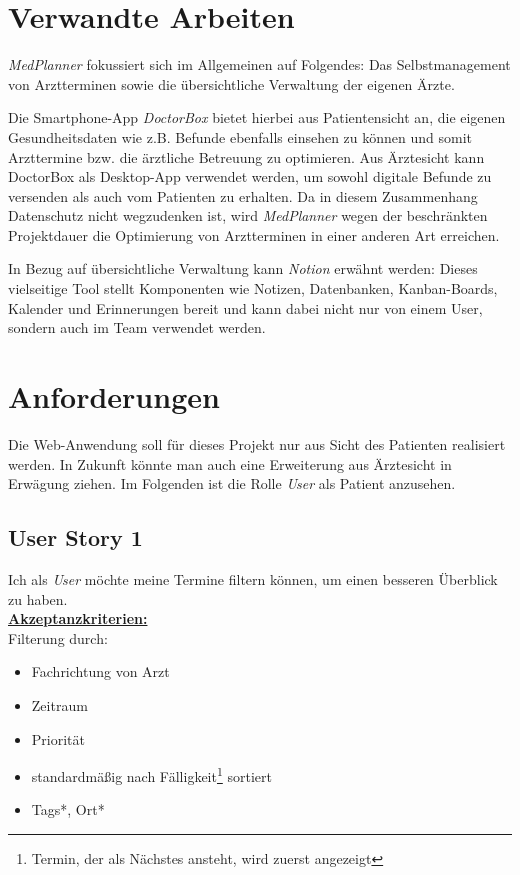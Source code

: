 \documentclass[conference]{IEEEtran}
\begin{document}
\section{Verwandte Arbeiten}
\textit{MedPlanner} fokussiert sich im Allgemeinen auf Folgendes: Das Selbstmanagement von Arztterminen sowie die übersichtliche Verwaltung der eigenen Ärzte.

Die Smartphone-App \textit{DoctorBox}\cite{docBox} bietet hierbei aus Patientensicht an, die eigenen Gesundheitsdaten wie z.B. Befunde ebenfalls einsehen zu können und somit Arzttermine bzw. die ärztliche Betreuung zu optimieren. Aus Ärztesicht kann DoctorBox als Desktop-App verwendet werden, um sowohl digitale Befunde zu versenden als auch vom Patienten zu erhalten. Da in diesem Zusammenhang Datenschutz nicht wegzudenken ist, wird \textit{MedPlanner} wegen der beschränkten Projektdauer die Optimierung von Arztterminen in einer anderen Art erreichen.

In Bezug auf übersichtliche Verwaltung kann \textit{Notion}\cite{notion} erwähnt werden: Dieses vielseitige Tool stellt Komponenten wie Notizen, Datenbanken, Kanban-Boards, Kalender und Erinnerungen bereit und kann dabei nicht nur von einem User, sondern auch im Team verwendet werden.

\section{Anforderungen}
Die Web-Anwendung soll für dieses Projekt nur aus Sicht des Patienten realisiert werden. In Zukunft könnte man auch eine Erweiterung aus Ärztesicht in Erwägung ziehen. Im Folgenden ist die Rolle \textit{User} als Patient anzusehen.

\subsection{User Story 1}
Ich als \textit{User} möchte meine Termine filtern können, um einen besseren Überblick zu haben.\\
\underline{\textbf{Akzeptanzkriterien:}}\\
Filterung durch:
\begin{itemize}
	\item Fachrichtung von Arzt
	\item Zeitraum
	\item Priorität
	\item standardmäßig nach Fälligkeit\footnote{Termin, der als Nächstes ansteht, wird zuerst angezeigt} sortiert
	\item Tags*, Ort* 
\end{itemize}
\end{document}
